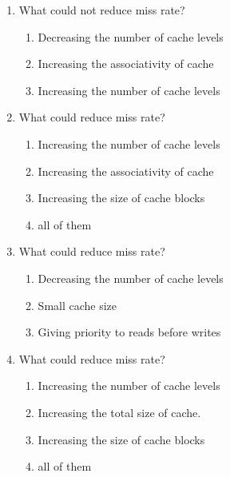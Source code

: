 \documentclass[paper=8.2in:11.6in]{scrartcl}
\begin{document}

\begin{enumerate}

\item What could not reduce miss rate?

\begin{enumerate}[label=\alph*)]

\item Decreasing the number of cache levels
\item Increasing the associativity of cache
\item Increasing the number of cache levels

\end{enumerate}

\item What could reduce miss rate?

\begin{enumerate}[label=\alph*)]

\item Increasing the number of cache levels
\item Increasing the associativity of cache
\item Increasing the size of cache blocks
\item all of them

\end{enumerate}

\item What could reduce miss rate?

\begin{enumerate}[label=\alph*)]

\item Decreasing the number of cache levels
\item Small cache size
\item Giving priority to reads before writes

\end{enumerate}

\item What could reduce miss rate?

\begin{enumerate}[label=\alph*)]

\item Increasing the number of cache levels
\item Increasing the total size of cache.
\item Increasing the size of cache blocks
\item all of them


\end{enumerate}
\end{enumerate}
\end{document}
